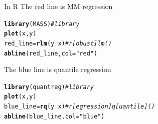 \documentclass[t,xcolor=pdftex,dvipsnames,table]{beamer}
\makeatletter
\newcommand{\hlstr}[1]{\textcolor[rgb]{0.192,0.494,0.8}{#1}}%
\newcommand{\hlcom}[1]{\textcolor[rgb]{0.678,0.584,0.686}{\textit{#1}}}%
\newcommand{\hlopt}[1]{\textcolor[rgb]{0,0,0}{#1}}%
\newcommand{\hlstd}[1]{\textcolor[rgb]{0.345,0.345,0.345}{#1}}%
\newcommand{\hlkwb}[1]{\textcolor[rgb]{0.69,0.353,0.396}{#1}}%
\newcommand{\hlkwc}[1]{\textcolor[rgb]{0.333,0.667,0.333}{#1}}%
\newcommand{\hlkwd}[1]{\textcolor[rgb]{0.737,0.353,0.396}{\textbf{#1}}}%
\newenvironment{kframe}{%
 \def\at@end@of@kframe{}%
 \ifinner\ifhmode%
  \def\at@end@of@kframe{\end{minipage}}%
  \begin{minipage}{\columnwidth}%
 \fi\fi%
 \def\FrameCommand##1{\hskip\@totalleftmargin \hskip-\fboxsep
 \colorbox{shadecolor}{##1}\hskip-\fboxsep
     \hskip-\linewidth \hskip-\@totalleftmargin \hskip\columnwidth}%
 \MakeFramed {\advance\hsize-\width
   \@totalleftmargin\z@ \linewidth\hsize
   \@setminipage}}%
 {\par\unskip\endMakeFramed%
 \at@end@of@kframe}
\newenvironment{knitrout}{}{} %
\makeatother
\begin{document}
\begin{frame}[fragile]{In R}
The red line is MM regression
\begin{knitrout}
\color{fgcolor}\begin{kframe}
\begin{alltt}
\hlkwd{library}\hlstd{(MASS)}   \hlcom{# library}
\hlkwd{plot}\hlstd{(x, y)}
\hlstd{red_line} \hlkwb{=} \hlkwd{rlm}\hlstd{(y}\hlopt{~}\hlstd{x)}  \hlcom{# r[obust]lm()}
\hlkwd{abline}\hlstd{(red_line,} \hlkwc{col}\hlstd{=}\hlstr{"red"}\hlstd{)}
\end{alltt}
\end{kframe}
\end{knitrout}
The blue line is quantile regression
\begin{knitrout}
\color{fgcolor}\begin{kframe}
\begin{alltt}
\hlkwd{library}\hlstd{(quantreg)}   \hlcom{# library}
\hlkwd{plot}\hlstd{(x, y)}
\hlstd{blue_line} \hlkwb{=} \hlkwd{rq}\hlstd{(y}\hlopt{~}\hlstd{x)}  \hlcom{# r[egression]q[uantile]()}
\hlkwd{abline}\hlstd{(blue_line,} \hlkwc{col}\hlstd{=}\hlstr{"blue"}\hlstd{)}
\end{alltt}
\end{kframe}
\end{knitrout}
\end{frame}
\end{document}
